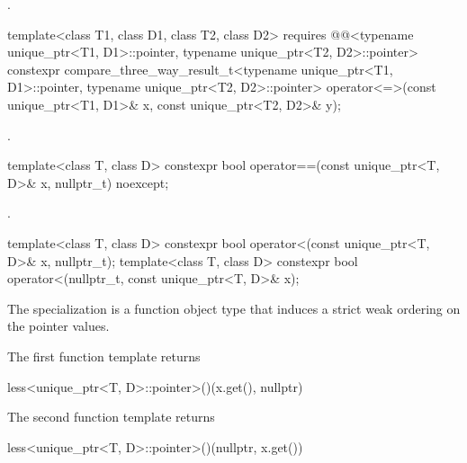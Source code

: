 \begin{itemdescr}
\pnum
\returns
{}.
\end{itemdescr}

%
\begin{itemdecl}
template<class T1, class D1, class T2, class D2>
  requires @@<typename unique_ptr<T1, D1>::pointer,
                                     typename unique_ptr<T2, D2>::pointer>
  constexpr compare_three_way_result_t<typename unique_ptr<T1, D1>::pointer,
                                       typename unique_ptr<T2, D2>::pointer>
    operator<=>(const unique_ptr<T1, D1>& x, const unique_ptr<T2, D2>& y);
\end{itemdecl}

\begin{itemdescr}
\pnum
\returns
{}.
\end{itemdescr}

%
\begin{itemdecl}
template<class T, class D>
  constexpr bool operator==(const unique_ptr<T, D>& x, nullptr_t) noexcept;
\end{itemdecl}

\begin{itemdescr}
\pnum
\returns
{}.
\end{itemdescr}

%
\begin{itemdecl}
template<class T, class D>
  constexpr bool operator<(const unique_ptr<T, D>& x, nullptr_t);
template<class T, class D>
  constexpr bool operator<(nullptr_t, const unique_ptr<T, D>& x);
\end{itemdecl}

\begin{itemdescr}
\pnum
\expects
The specialization  is
a function object type that induces a strict weak
ordering on the pointer values.

\pnum
\returns
The first function template returns
\begin{codeblock}
less<unique_ptr<T, D>::pointer>()(x.get(), nullptr)
\end{codeblock}
The second function template returns
\begin{codeblock}
less<unique_ptr<T, D>::pointer>()(nullptr, x.get())
\end{codeblock}
\end{itemdescr}

